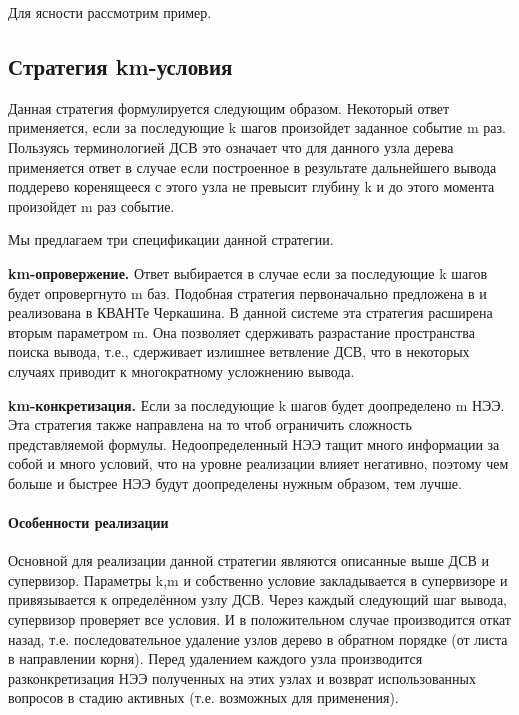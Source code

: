 Для ясности рассмотрим пример.



\subsection{Стратегия km-условия}
Данная стратегия формулируется следующим образом. Некоторый ответ применяется, если за последующие k шагов произойдет заданное событие m раз. Пользуясь терминологией ДСВ это означает что для данного узла дерева применяется ответ в случае если построенное в результате дальнейшего вывода поддерево коренящееся с этого узла не превысит глубину k и до этого момента произойдет m раз событие. 

Мы предлагаем три спецификации данной стратегии.

\textbf{km-опровержение.} Ответ выбирается в случае если за последующие k шагов будет опровергнуто m баз. Подобная стратегия первоначально предложена в \cite{ICDS2000} и реализована в КВАНТе Черкашина. В данной системе эта стратегия расширена вторым параметром m. Она позволяет сдерживать разрастание пространства поиска вывода, т.е., сдерживает излишнее ветвление ДСВ, что в некоторых случаях приводит к многократному усложнению вывода.

\textbf{km-конкретизация.} Если за последующие k шагов будет доопределено m НЭЭ. Эта стратегия также направлена на то чтоб ограничить сложность представляемой формулы. Недоопределенный НЭЭ тащит много информации за собой и много условий, что на уровне реализации влияет негативно, поэтому чем больше и быстрее НЭЭ будут доопределены нужным образом, тем лучше.

\paragraph{Особенности реализации}
Основной для реализации данной стратегии являются описанные выше ДСВ и супервизор. Параметры k,m и собственно условие закладывается в супервизоре и привязывается к определённом узлу ДСВ. Через каждый следующий шаг вывода, супервизор проверяет все условия. И в положительном случае производится откат назад, т.е. последовательное удаление узлов дерево в обратном порядке (от листа в направлении корня). Перед удалением каждого узла производится разконкретизация НЭЭ полученных на этих узлах и возврат использованных вопросов в стадию активных (т.е. возможных для применения).

